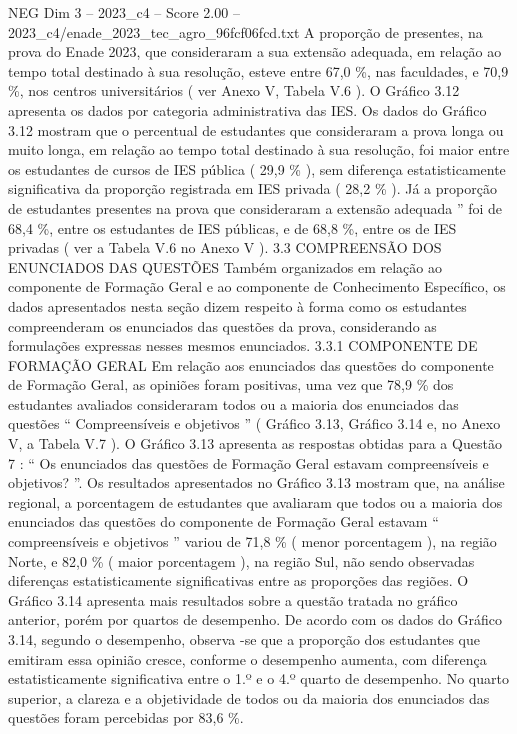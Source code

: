\begin{textsample}{NEG Dim 3 – 2023\_c4 – Score 2.00 – 2023\_c4/enade\_2023\_tec\_agro\_96fcf06fcd.txt}
A proporção de presentes, na prova do Enade 2023, que consideraram a sua extensão adequada, em relação ao tempo total destinado à sua resolução, esteve entre 67,0 \%, nas faculdades, e 70,9 \%, nos centros universitários ( ver Anexo V, Tabela V.6 ).
O Gráfico 3.12 apresenta os dados por categoria administrativa das IES.
Os dados do Gráfico 3.12 mostram que o percentual de estudantes que consideraram a prova longa ou muito longa, em relação ao tempo total destinado à sua resolução, foi maior entre os estudantes de cursos de IES pública ( 29,9 \% ), sem diferença estatisticamente significativa da proporção registrada em IES privada ( 28,2 \% ).
Já a proporção de estudantes presentes na prova que consideraram a extensão adequada ” foi de 68,4 \%, entre os estudantes de IES públicas, e de 68,8 \%, entre os de IES privadas ( ver a Tabela V.6 no Anexo V ). 3.3 COMPREENSÃO DOS ENUNCIADOS DAS QUESTÕES Também organizados em relação ao componente de Formação Geral e ao componente de Conhecimento Específico, os dados apresentados nesta seção dizem respeito à forma como os estudantes compreenderam os enunciados das questões da prova, considerando as formulações expressas nesses mesmos enunciados. 3.3.1 COMPONENTE DE FORMAÇÃO GERAL Em relação aos enunciados das questões do componente de Formação Geral, as opiniões foram positivas, uma vez que 78,9 \% dos estudantes avaliados consideraram todos ou a maioria dos enunciados das questões “ Compreensíveis e objetivos ” ( Gráfico 3.13, Gráfico 3.14 e, no Anexo V, a Tabela V.7 ).
O Gráfico 3.13 apresenta as respostas obtidas para a Questão 7 : “ Os enunciados das questões de Formação Geral estavam compreensíveis e objetivos? ”.
Os resultados apresentados no Gráfico 3.13 mostram que, na análise regional, a porcentagem de estudantes que avaliaram que todos ou a maioria dos enunciados das questões do componente de Formação Geral estavam “ compreensíveis e objetivos ” variou de 71,8 \% ( menor porcentagem ), na região Norte, e 82,0 \% ( maior porcentagem ), na região Sul, não sendo observadas diferenças estatisticamente significativas entre as proporções das regiões.
O Gráfico 3.14 apresenta mais resultados sobre a questão tratada no gráfico anterior, porém por quartos de desempenho.
De acordo com os dados do Gráfico 3.14, segundo o desempenho, observa -se que a proporção dos estudantes que emitiram essa opinião cresce, conforme o desempenho aumenta, com diferença estatisticamente significativa entre o 1.º e o 4.º quarto de desempenho.
No quarto superior, a clareza e a objetividade de todos ou da maioria dos enunciados das questões foram percebidas por 83,6 \%.

\end{textsample}
